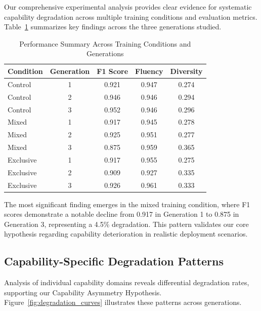 \documentclass{article}
\begin{document}
Our comprehensive experimental analysis provides clear evidence for systematic capability degradation across multiple training conditions and evaluation metrics. Table~\ref{tab:performance_summary} summarizes key findings across the three generations studied.

\begin{table}[ht]
\centering
\caption{Performance Summary Across Training Conditions and Generations}
\label{tab:performance_summary}
\begin{tabular}{@{}lcccc@{}}
\toprule
Condition & Generation & F1 Score & Fluency & Diversity \\
\midrule
Control & 1 & 0.921 & 0.947 & 0.274 \\
Control & 2 & 0.946 & 0.946 & 0.294 \\
Control & 3 & 0.952 & 0.946 & 0.296 \\
\midrule
Mixed & 1 & 0.917 & 0.945 & 0.278 \\
Mixed & 2 & 0.925 & 0.951 & 0.277 \\
Mixed & 3 & 0.875 & 0.959 & 0.365 \\
\midrule
Exclusive & 1 & 0.917 & 0.955 & 0.275 \\
Exclusive & 2 & 0.909 & 0.927 & 0.335 \\
Exclusive & 3 & 0.926 & 0.961 & 0.333 \\
\bottomrule
\end{tabular}
\end{table}

The most significant finding emerges in the mixed training condition, where F1 scores demonstrate a notable decline from 0.917 in Generation 1 to 0.875 in Generation 3, representing a 4.5\% degradation. This pattern validates our core hypothesis regarding capability deterioration in realistic deployment scenarios.

\subsection{Capability-Specific Degradation Patterns}

Analysis of individual capability domains reveals differential degradation rates, supporting our Capability Asymmetry Hypothesis. Figure~\ref{fig:degradation_curves} illustrates these patterns across generations.
\end{document}
